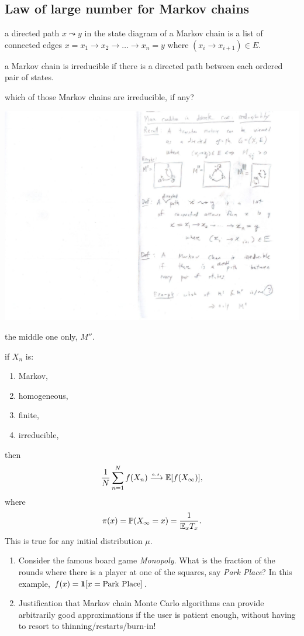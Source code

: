 \documentclass{article}
\begin{document}
\subsection{Law of large number for Markov chains}

 a directed path $x \leadsto y$ in the state diagram of a Markov chain is a list of connected edges $x = x_1 \to x_2 \to \dots \to x_n = y$ where $(x_i \to x_{i+1}) \in E$.

 a Markov chain is irreducible if there is a directed path between each ordered pair of states.

 which of those Markov chains are irreducible, if any?
\begin{center}
	\includegraphics[width=0.6\linewidth]{figures/irred-example} 
\end{center}
 the middle one only, $M''$.

 if $X_n$ is:
\begin{enumerate}
  \item Markov,
  \item homogeneous,
  \item finite, 
  \item irreducible,
\end{enumerate}
then \[ \frac{1}{N} \sum_{n=1}^N f(X_n) \stackrel{\scriptscriptstyle a.s.}{\longrightarrow} {\mathbb E}[f(X_\infty)],\]
where \[\pi(x) = {\mathbb P}(X_\infty = x) = \frac{1}{{\mathbb E}_x T_x}. \] This is true for any initial distribution $\mu$.

\begin{enumerate}
	\item Consider the famous board game \emph{Monopoly}. What is the fraction of the rounds where there is a player at one of the squares, say \emph{Park Place}? In this example, $f(x) = {\mathbf 1}[x = \text{Park Place}]$.
	\item Justification that Markov chain Monte Carlo algorithms can provide arbitrarily good approximations if the user is patient enough, without having to resort to thinning/restarts/burn-in!
\end{enumerate}
\end{document}
